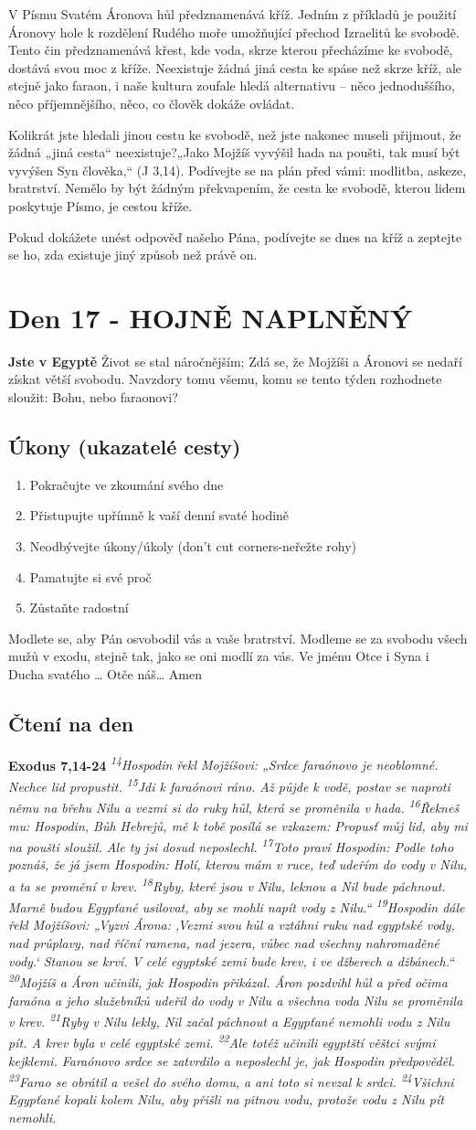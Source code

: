 \documentclass[11pt]{article}
\newcommand{\zacatekTretiTyden}{
  \textbf{Jste v Egyptě} \newline
  Život se stal náročnějším; Zdá se, že Mojžíši a Áronovi se nedaří získat větší svobodu. Navzdory tomu všemu,
komu se tento týden rozhodnete sloužit: Bohu, nebo faraonovi?

\subsection*{Úkony (ukazatelé cesty)}
\begin{enumerate}
  \item Pokračujte ve zkoumání svého dne
  \item Přistupujte upřímně k vaší denní svaté hodině
  \item Neodbývejte úkony/úkoly (don’t cut corners-neřežte rohy)
  \item Pamatujte si své proč
  \item Zůstaňte radostní
\end{enumerate}
Modlete se, aby Pán osvobodil vás a vaše bratrství. \newline
Modleme se za svobodu všech mužů v exodu, stejně tak, jako se oni modlí za vás.\newline
Ve jménu Otce i Syna i Ducha svatého …  Otče náš… Amen
}
\begin{document}
V Písmu Svatém Áronova hůl předznamenává kříž. Jedním z příkladů je použití Áronovy hole k rozdělení
Rudého moře umožňující přechod Izraelitů ke svobodě. Tento čin předznamenává křest, kde voda, skrze
kterou přecházíme ke svobodě, dostává svou moc z kříže. Neexistuje žádná jiná cesta ke spáse než skrze
kříž, ale stejně jako faraon, i naše kultura zoufale hledá alternativu – něco jednoduššího, něco
příjemnějšího, něco, co člověk dokáže ovládat.

Kolikrát jste hledali jinou cestu ke svobodě, než jste nakonec museli přijmout, že žádná „jiná cesta“
neexistuje?„Jako Mojžíš vyvýšil hada na poušti, tak musí být vyvýšen Syn člověka,“ (J 3,14). Podívejte
se na plán před vámi: modlitba, askeze, bratrství. Nemělo by být žádným překvapením, že cesta ke
svobodě, kterou lidem poskytuje Písmo, je cestou kříže.

Pokud dokážete unést odpověď našeho Pána, podívejte se dnes na kříž a zeptejte se ho, zda existuje jiný
způsob než právě on.

\newpage
\section{Den 17 - HOJNĚ NAPLNĚNÝ}
\zacatekTretiTyden
\subsection*{Čtení na den}
\textbf{Exodus 7,14-24}
\newline
\textit{ 
\textsuperscript{14}Hospodin řekl Mojžíšovi: „Srdce faraónovo je neoblomné. Nechce lid propustit.
\textsuperscript{15}Jdi k faraónovi ráno. Až půjde k vodě, postav se naproti němu na břehu Nilu a vezmi si do ruky hůl, která se proměnila v hada.
\textsuperscript{16}Řekneš mu: Hospodin, Bůh Hebrejů, mě k tobě posílá se vzkazem: Propusť můj lid, aby mi na poušti sloužil. Ale ty jsi dosud neposlechl.
\textsuperscript{17}Toto praví Hospodin: Podle toho poznáš, že já jsem Hospodin: Holí, kterou mám v ruce, teď udeřím do vody v Nilu, a ta se promění v krev.
\textsuperscript{18}Ryby, které jsou v Nilu, leknou a Nil bude páchnout. Marně budou Egypťané usilovat, aby se mohli napít vody z Nilu.“
\textsuperscript{19}Hospodin dále řekl Mojžíšovi: „Vyzvi Árona: ‚Vezmi svou hůl a vztáhni ruku nad egyptské vody, nad průplavy, nad říční ramena, nad jezera, vůbec nad všechny nahromaděné vody.‘ Stanou se krví. V celé egyptské zemi bude krev, i ve džberech a džbánech.“
\textsuperscript{20}Mojžíš a Áron učinili, jak Hospodin přikázal. Áron pozdvihl hůl a před očima faraóna a jeho služebníků udeřil do vody v Nilu a všechna voda Nilu se proměnila v krev.
\textsuperscript{21}Ryby v Nilu lekly, Nil začal páchnout a Egypťané nemohli vodu z Nilu pít. A krev byla v celé egyptské zemi.
\textsuperscript{22}Ale totéž učinili egyptští věštci svými kejklemi. Faraónovo srdce se zatvrdilo a neposlechl je, jak Hospodin předpověděl.
\textsuperscript{23}Farao se obrátil a vešel do svého domu, a ani toto si nevzal k srdci.
\textsuperscript{24}Všichni Egypťané kopali kolem Nilu, aby přišli na pitnou vodu, protože vodu z Nilu pít nemohli.
}
\end{document}
